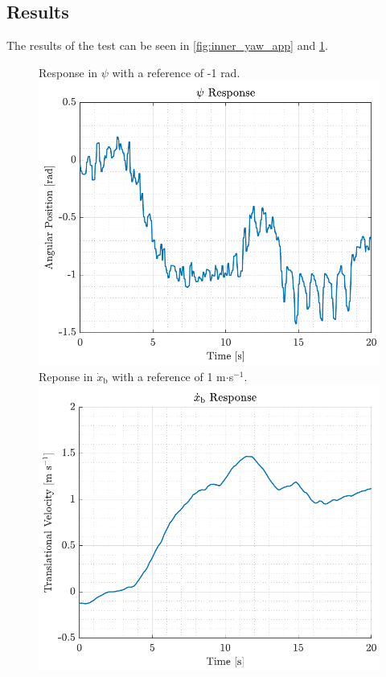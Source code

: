 \subsection*{Results}
The results of the test can be seen in \autoref{fig:inner_yaw_app} and \ref{fig:inner_xbdot_app}.
\begin{figure}[H]
    \captionbox 
    {   
        Response in $\psi$ with a reference of -1 rad.
        \label{fig:inner_yaw_app}
    }                                                                 
    {                                                                  
        \includegraphics[width=.45\textwidth]{figures/inner_yaw}         
    }                                                                    
    \hspace{5pt}                                                          
    \captionbox  
    {      
        Reponse in $\dot{x}_\mathrm{b}$ with a reference of 1 m$\cdot$s$^{-1}$.
        \label{fig:inner_xbdot_app}
    }                                                                          
    {
        \includegraphics[width=.45\textwidth]{figures/inner_xbdot}
    }
\end{figure}

